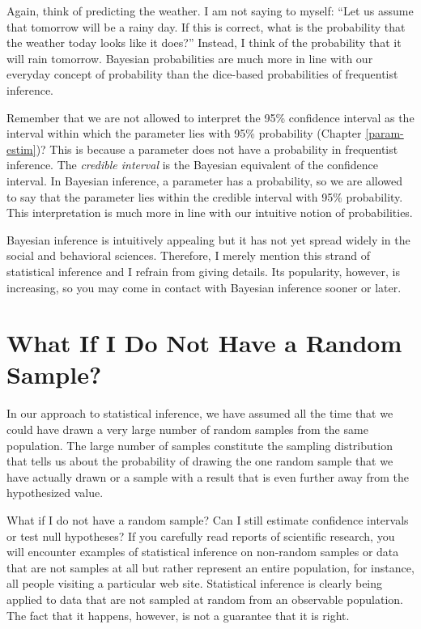 \documentclass[a4paper]{book}
\theoremstyle{definition}
\theoremstyle{definition}
\theoremstyle{definition}
\theoremstyle{remark}
\begin{document}
Again, think of predicting the weather. I am not saying to myself: ``Let
us assume that tomorrow will be a rainy day. If this is correct, what is
the probability that the weather today looks like it does?'' Instead, I
think of the probability that it will rain tomorrow. Bayesian
probabilities are much more in line with our everyday concept of
probability than the dice-based probabilities of frequentist inference.

Remember that we are not allowed to interpret the 95\% confidence
interval as the interval within which the parameter lies with 95\%
probability (Chapter \ref{param-estim})? This is because a parameter
does not have a probability in frequentist inference. The \emph{credible
interval} is the Bayesian equivalent of the confidence interval. In
Bayesian inference, a parameter has a probability, so we are allowed to
say that the parameter lies within the credible interval with 95\%
probability. This interpretation is much more in line with our intuitive
notion of probabilities.

Bayesian inference is intuitively appealing but it has not yet spread
widely in the social and behavioral sciences. Therefore, I merely
mention this strand of statistical inference and I refrain from giving
details. Its popularity, however, is increasing, so you may come in
contact with Bayesian inference sooner or later.

\section{What If I Do Not Have a Random Sample?}\label{no-random-sample}

In our approach to statistical inference, we have assumed all the time
that we could have drawn a very large number of random samples from the
same population. The large number of samples constitute the sampling
distribution that tells us about the probability of drawing the one
random sample that we have actually drawn or a sample with a result that
is even further away from the hypothesized value.

What if I do not have a random sample? Can I still estimate confidence
intervals or test null hypotheses? If you carefully read reports of
scientific research, you will encounter examples of statistical
inference on non-random samples or data that are not samples at all but
rather represent an entire population, for instance, all people visiting
a particular web site. Statistical inference is clearly being applied to
data that are not sampled at random from an observable population. The
fact that it happens, however, is not a guarantee that it is right.
\end{document}
